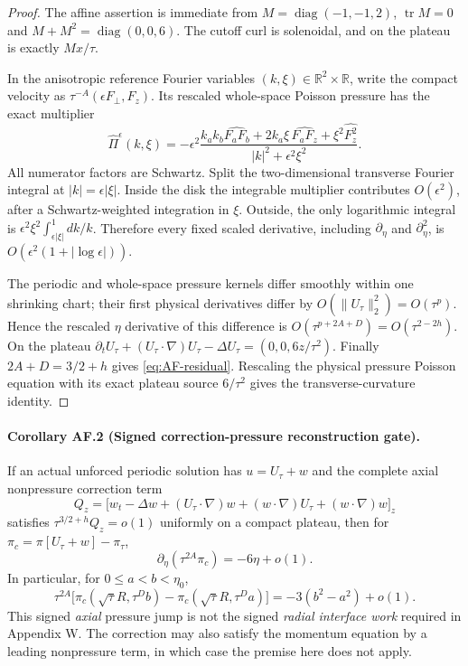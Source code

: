 \begin{proof}
The affine assertion is immediate from $M=\operatorname{diag}(-1,-1,2)$, $\operatorname{tr}M=0$ and $M+M^2=\operatorname{diag}(0,0,6)$. The cutoff curl is solenoidal, and on the plateau is exactly $Mx/\tau$.

In the anisotropic reference Fourier variables $(k,\xi)\in\mathbb R^2\times\mathbb R$, write the compact velocity as $\tau^{-A}(\epsilon F_\perp,F_z)$. Its rescaled whole-space Poisson pressure has the exact multiplier
\[
 \widehat\Pi^\epsilon(k,\xi)=
 -\epsilon^2\frac{k_a k_b\widehat{F_aF_b}
     +2 k_a\xi\,\widehat{F_aF_z}
     +\xi^2\widehat{F_z^2}}{|k|^2+\epsilon^2\xi^2}.
\]
All numerator factors are Schwartz. Split the two-dimensional transverse Fourier integral at $|k|=\epsilon|\xi|$. Inside the disk the integrable multiplier contributes $O(\epsilon^2)$, after a Schwartz-weighted integration in $\xi$. Outside, the only logarithmic integral is $\epsilon^2\xi^2\int_{\epsilon|\xi|}^1 dk/k$. Therefore every fixed scaled derivative, including $\partial_\eta$ and $\partial_\eta^2$, is $O(\epsilon^2(1+|\log\epsilon|))$.

The periodic and whole-space pressure kernels differ smoothly within one shrinking chart; their first physical derivatives differ by $O(\|U_\tau\|_2^2)=O(\tau^p)$. Hence the rescaled $\eta$ derivative of this difference is $O(\tau^{p+2A+D})=O(\tau^{2-2h})$. On the plateau $\partial_tU_\tau+(U_\tau\cdot\nabla)U_\tau-\Delta U_\tau=(0,0,6z/\tau^2)$. Finally $2A+D=3/2+h$ gives \eqref{eq:AF-residual}. Rescaling the physical pressure Poisson equation with its exact plateau source $6/\tau^2$ gives the transverse-curvature identity.
\end{proof}

\paragraph{Corollary AF.2 (Signed correction-pressure reconstruction gate).}
If an actual unforced periodic solution has $u=U_\tau+w$ and the complete axial nonpressure correction term
\[
 Q_z=\big[w_t-\Delta w+(U_\tau\cdot\nabla)w+(w\cdot\nabla)U_\tau+(w\cdot\nabla)w\big]_z
\]
satisfies $\tau^{3/2+h}Q_z=o(1)$ uniformly on a compact plateau, then for
$\pi_c=\pi[U_\tau+w]-\pi_\tau$,
\[
 \partial_\eta(\tau^{2A}\pi_c)=-6\eta+o(1).
\]
In particular, for $0\le a<b<\eta_0$,
\begin{equation}\label{eq:AF-jump}
 \boxed{\tau^{2A}\big[\pi_c(\sqrt\tau R,\tau^D b)-
 \pi_c(\sqrt\tau R,\tau^D a)\big]=-3(b^2-a^2)+o(1).}
\end{equation}
This signed \emph{axial} pressure jump is not the signed \emph{radial interface work} required in Appendix W. The correction may also satisfy the momentum equation by a leading nonpressure term, in which case the premise here does not apply.

